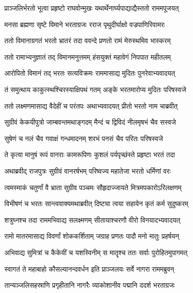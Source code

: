 \twolineshloka
{प्राञ्जलिर्भरतो भूत्वा प्रहृष्टो राघवोन्मुखः}
{यथार्थेनार्घ्यपाद्याद्यैस्ततो राममपूजयत्} %

\twolineshloka
{मनसा ब्रह्मणा सृष्टे विमाने भरताग्रजः}
{रराज पृथुदीर्घाक्षो वज्रपाणिरिवामरः} %

\twolineshloka
{ततो विमानाग्रगतं भरतो भ्रातरं तदा}
{ववन्दे प्रणतो रामं मेरुस्थमिव भास्करम्} %

\twolineshloka
{ततो रामाभ्यनुज्ञातं तद् विमानमनुत्तमम्}
{हंसयुक्तं महावेगं निपपात महीतलम्} %

\twolineshloka
{आरोपितो विमानं तद् भरतः सत्यविक्रमः}
{राममासाद्य मुदितः पुनरेवाभ्यवादयत्} %

\twolineshloka
{तं समुत्थाय काकुत्स्थश्चिरस्याक्षिपथं गतम्}
{अङ्के भरतमारोप्य मुदितः परिषस्वजे} %

\twolineshloka
{ततो लक्ष्मणमासाद्य वैदेहीं च परंतपः}
{अथाभ्यवादयत् प्रीतो भरतो नाम चाब्रवीत्} %

\twolineshloka
{सुग्रीवं केकयीपुत्रो जाम्बवन्तमथाङ्गदम्}
{मैन्दं च द्विविदं नीलमृषभं चैव सस्वजे} %

\twolineshloka
{सुषेणं च नलं चैव गवाक्षं गन्धमादनम्}
{शरभं पनसं चैव परितः परिषस्वजे} %

\twolineshloka
{ते कृत्वा मानुषं रूपं वानराः कामरूपिणः}
{कुशलं पर्यपृच्छंस्ते प्रहृष्टा भरतं तदा} %

\twolineshloka
{अथाब्रवीद् राजपुत्रः सुग्रीवं वानरर्षभम्}
{परिष्वज्य महातेजा भरतो धर्मिणां वरः} %

\twolineshloka
{त्वमस्माकं चतुर्णां वै भ्राता सुग्रीव पञ्चमः}
{सौहृदाज्जायते मित्रमपकारोऽरिलक्षणम्} %

\twolineshloka
{विभीषणं च भरतः सान्त्ववाक्यमथाब्रवीत्}
{दिष्ट्या त्वया सहायेन कृतं कर्म सुदुष्करम्} %

\twolineshloka
{शत्रुघ्नश्च तदा राममभिवाद्य सलक्ष्मणम्}
{सीतायाश्चरणौ वीरो विनयादभ्यवादयत्} %

\twolineshloka
{रामो मातरमासाद्य विवर्णां शोककर्शिताम्}
{जग्राह प्रणतः पादौ मनो मातुः प्रहर्षयन्} %

\twolineshloka
{अभिवाद्य सुमित्रां च कैकेयीं च यशस्विनीम्}
{स मातॄश्च ततः सर्वाः पुरोहितमुपागमत्} %

\twolineshloka
{स्वागतं ते महाबाहो कौसल्यानन्दवर्धन}
{इति प्राञ्जलयः सर्वे नागरा राममब्रुवन्} %

\twolineshloka
{तान्यञ्जलिसहस्राणि प्रगृहीतानि नागरैः}
{व्याकोशानीव पद्मानि ददर्श भरताग्रजः} %


